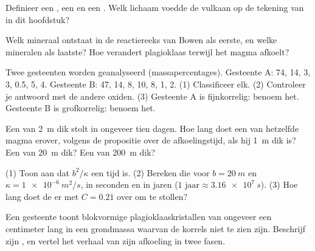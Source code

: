 \begin{exercise}[$\star$]\label{exo:g11:igneous-rocks:4}
Definieer een , een  en een . Welk lichaam voedde de vulkaan op de
tekening van  in dit hoofdstuk?
\end{exercise}

\begin{exercise}[$\star$]\label{exo:g11:igneous-rocks:5}
Welk mineraal ontstaat in de reactiereeks van Bowen als eerste, en welke mineralen
als laatste? Hoe verandert plagioklaas terwijl het magma afkoelt?
\end{exercise}

\begin{exercise}[$\star\star$]\label{exo:g11:igneous-rocks:6}
Twee gesteenten worden geanalyseerd (massapercentages). Gesteente A:  74, 
14,  3,  3,  0.5,  5,  4. Gesteente B:
 47,  14,  8,  10,  8, 
1,  2. (1) Classificeer elk. (2) Controleer je antwoord met de andere
oxiden. (3) Gesteente A is fijnkorrelig: benoem het. Gesteente B is grofkorrelig: benoem
het.
\end{exercise}

\begin{exercise}[$\star\star$]\label{exo:g11:igneous-rocks:7}
Een  van \qty{2}{m} dik stolt in ongeveer tien dagen. Hoe lang doet een  van
hetzelfde magma erover, volgens de propositie over de afkoelingstijd, als hij
\qty{1}{m} dik is? Een  van \qty{20}{m} dik? Een van \qty{200}{m} dik?
\end{exercise}

\begin{exercise}[$\star\star$]\label{exo:g11:igneous-rocks:8}
(1) Toon aan dat $b^2/\kappa$ een tijd is. (2) Bereken die voor $b = \qty{20}{m}$
en $\kappa = \qty{1e-6}{m^2/s}$, in seconden en in jaren
($\num{1}\text{ jaar} \approx \qty{3.16e7}{s}$). (3) Hoe lang doet de  er met $C = 0.21$
over om te stollen?
\end{exercise}

\begin{exercise}[$\star\star$]\label{exo:g11:igneous-rocks:9}
Een gesteente toont blokvormige plagioklaaskristallen van ongeveer een centimeter lang in een
grondmassa waarvan de korrels niet te zien zijn. Beschrijf zijn , en vertel het
verhaal van zijn afkoeling in twee fasen.
\end{exercise}

